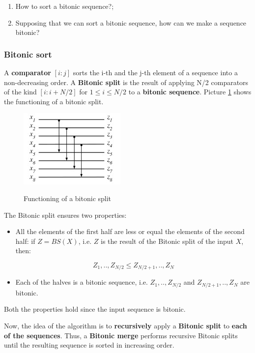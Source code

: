 \begin{enumerate}
    \item How to sort a bitonic sequence?;
    \item Supposing that we can sort a bitonic sequence, how can we make a sequence bitonic?
\end{enumerate}

\subsubsection{Bitonic sort}
A \textbf{comparator} $[i:j]$ sorts the i-th and the j-th element of a sequence into a non-decreasing order. A \textbf{Bitonic split} is the result of applying N/2 comparators of the kind $[i:i + N/2]$ for $1 \leq i \leq N/2$ to a \textbf{bitonic sequence}. Picture \ref{bitonic split} shows the functioning of a bitonic split.

\begin{figure}[h!]
		\centering
		\includegraphics[scale = 2.0]{img/bitonic split.jpg}
        \label{bitonic split}
        \caption{Functioning of a bitonic split}
\end{figure}

The Bitonic split ensures two properties:

\begin{itemize}
    \item All the elements of the first half are less or equal the elements of the second half: if $Z = BS(X)$, i.e. $Z$ is the result of the Bitonic split of the input $X$, then:

    $$
    Z_1, .., Z_{N/2} \leq Z_{N/2 + 1}, .., Z_N
    $$

    \item Each of the halves is a bitonic sequence, i.e. $Z_1, .., Z_{N/2}$ and $Z_{N/2 + 1}, .., Z_N$ are bitonic.
\end{itemize}

Both the properties hold since the input sequence is bitonic.

Now, the idea of the algorithm is to \textbf{recursively} apply a \textbf{Bitonic split} to \textbf{each of the sequences}. Thus, a \textbf{Bitonic merge} performs recursive Bitonic splits until the resulting sequence is sorted in increasing order.


